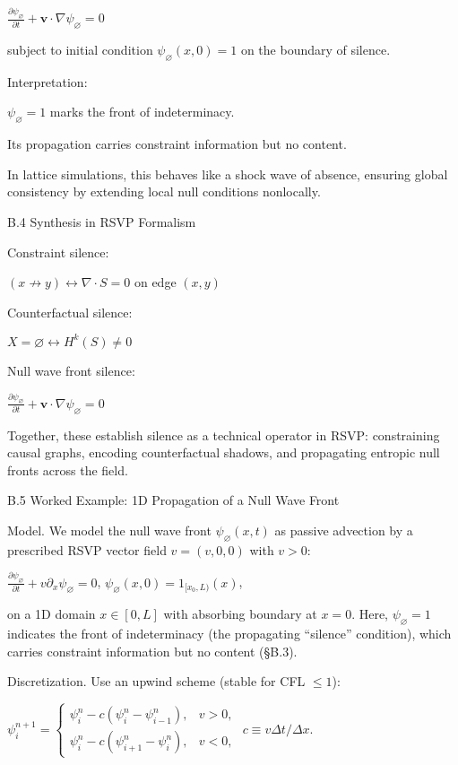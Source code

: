 \documentclass[11pt,a4paper]{article}
\begin{document}
$\frac{\partial \psi_\varnothing}{\partial t} + \mathbf{v} \cdot \nabla \psi_\varnothing = 0$

subject to initial condition $\psi_{\varnothing}(x,0) = 1$ on the boundary of silence.

Interpretation:

$\psi_{\varnothing} = 1$ marks the front of indeterminacy.

Its propagation carries constraint information but no content.

In lattice simulations, this behaves like a shock wave of absence, ensuring global consistency by extending local null conditions nonlocally.

B.4 Synthesis in RSVP Formalism

Constraint silence:

$(x \not\to y) \leftrightarrow \nabla \cdot S = 0$ on edge $(x,y)$

Counterfactual silence:

$X = \varnothing \leftrightarrow H^k (S) \neq 0$

Null wave front silence:

$\frac{\partial \psi_\varnothing}{\partial t} + \mathbf{v} \cdot \nabla \psi_\varnothing = 0$

Together, these establish silence as a technical operator in RSVP: constraining causal graphs, encoding counterfactual shadows, and propagating entropic null fronts across the field.

B.5 Worked Example: 1D Propagation of a Null Wave Front

Model. We model the null wave front $\psi_{\varnothing}(x,t)$ as passive advection by a prescribed RSVP vector field $v = (v,0,0)$ with $v > 0$:

$\frac{\partial \psi_\varnothing}{\partial t} + v \partial_x \psi_\varnothing = 0$, $\psi_{\varnothing}(x,0) = 1_{[x_0, L)}(x)$,

on a 1D domain $x \in [0,L]$ with absorbing boundary at $x=0$. Here, $\psi_{\varnothing} = 1$ indicates the front of indeterminacy (the propagating “silence” condition), which carries constraint information but no content (§B.3).

Discretization. Use an upwind scheme (stable for CFL $\leq 1$):

$\psi_i^{n+1} = \begin{cases} \psi_i^n - c (\psi_i^n - \psi_{i-1}^n), & v > 0, \\ \psi_i^n - c (\psi_{i+1}^n - \psi_i^n), & v < 0, \end{cases}$ $c \equiv v \Delta t / \Delta x$.
\end{document}

